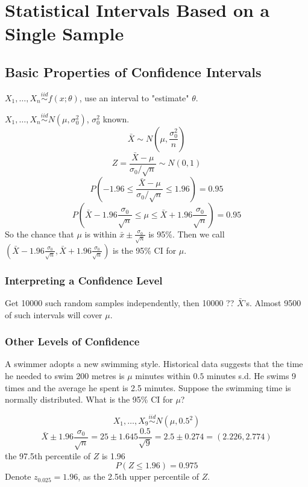 \chapter{Statistical Intervals Based on a Single Sample}
\section{Basic Properties of Confidence Intervals}
$X_1,\dots,X_n \overset{iid}{\sim} f(x;\theta)$, use an interval to "estimate" $\theta$.

\begin{exmp}
$X_1,\dots,X_n \overset{iid}{\sim} N(\mu,\sigma_0^2)$, $\sigma_0^2$ known.
\[\bar{X}\sim N\left(\mu,\frac{\sigma_0^2}{n}\right)\]
\[Z=\frac{\bar{X}-\mu}{\sigma_0/\sqrt{n}}\sim N(0,1)\]
\[P\left(-1.96\leq \frac{\bar{X}-\mu}{\sigma_0/\sqrt{n}} \leq 1.96 \right) =0.95\]
\[P\left(\bar{X}-1.96 \frac{\sigma_0}{\sqrt{n}} \leq \mu \leq \bar{X}+1.96 \frac{\sigma_0}{\sqrt{n}} \right) =0.95\]
So the chance that $\mu$ is within $\bar{x}\pm \frac{\sigma_0}{\sqrt{n}} $ is 95\%. Then we call $\left(\bar{X}-1.96 \frac{\sigma_0}{\sqrt{n}},\bar{X}+1.96 \frac{\sigma_0}{\sqrt{n}} \right)$ is the 95\% CI for $\mu$.
\end{exmp}

\subsection{Interpreting a Confidence Level}
Get 10000 such random samples independently, then 10000 ?? $\bar{X}$'s. Almost 9500 of such intervals will cover $\mu$.

\subsection{Other Levels of Confidence}

\begin{exmp}
A swimmer adopts a new swimming style. Historical data suggests that the time he needed to swim 200 metres is $\mu$ minutes within $0.5$ minutes s.d. He swims 9 times and the average he spent is 2.5 minutes. Suppose the swimming time is normally distributed. What is the 95\% CI for $\mu$?

\[X_1,\dots,X_9 \overset{iid}{\sim} N(\mu,0.5^2)\]
\[\bar{X}\pm 1.96 \frac{\sigma_0}{\sqrt{n}}=25 \pm 1.645 \frac{0.5}{\sqrt{9}}=2.5 \pm 0.274=(2.226,2.774) \]
the 97.5th percentile of $Z$ is 1.96 
\[P(Z \leq 1.96)=0.975\]
Denote $z_{0.025}=1.96$, as the 2.5th upper percentile of $Z$.
\end{exmp}

